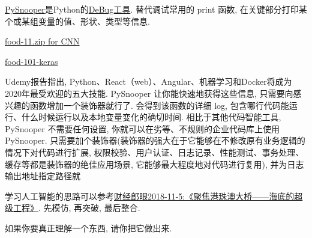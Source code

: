 \href{https://pypi.org/project/PySnooper/}{PySnooper}是Python的\href{https://github.com/cool-RR/PySnooper}{DeBug工具}. 替代调试常用的 print 函数, 在关键部分打印某个或某组变量的值、形状、类型等信息.

\href{https://drive.google.com/uc?id=19CzXudqN58R3D-1G8KeFWk8UDQwlb8is}{\href{https://drive.google.com/drive/my-drive}{food-11.zip} for CNN}

\href{https://github.com/zggl/food-101-keras}{food-101-keras}

Udemy报告指出, Python、React（web）、Angular、机器学习和Docker将成为2020年最受欢迎的五大技能.
PySnooper 让你能快速地获得这些信息, 只需要向感兴趣的函数增加一个装饰器就行了.
会得到该函数的详细 log, 包含哪行代码能运行、什么时候运行以及本地变量变化的确切时间.
相比于其他代码智能工具, PySnooper 不需要任何设置, 你就可以在劣等、不规则的企业代码库上使用 PySnooper.
只需要加个装饰器(装饰器的强大在于它能够在不修改原有业务逻辑的情况下对代码进行扩展, 权限校验、用户认证、日志记录、性能测试、事务处理、缓存等都是装饰器的绝佳应用场景, 它能够最大程度地对代码进行复用), 并为日志输出地址指定路径就
\begin{tcolorbox}[colback=yellow!5!white,colframe=yellow!50!black, colbacktitle=yellow!75!black]
学习人工智能的思路可以参考\href{https://www.iqiyi.com/v_19rr3csqmo.html}{财经郎眼2018-11-5:《聚焦港珠澳大桥——海底的超级工程》}. 先模仿, 再突破, 最后整合.
\begin{tcolorbox}[colback=white!50,colframe=orange!50,title=费曼]
\begin{center}
 如果你要真正理解一个东西, 请你把它做出来.
\end{center}
\end{tcolorbox}
\end{tcolorbox}
%
%
%
